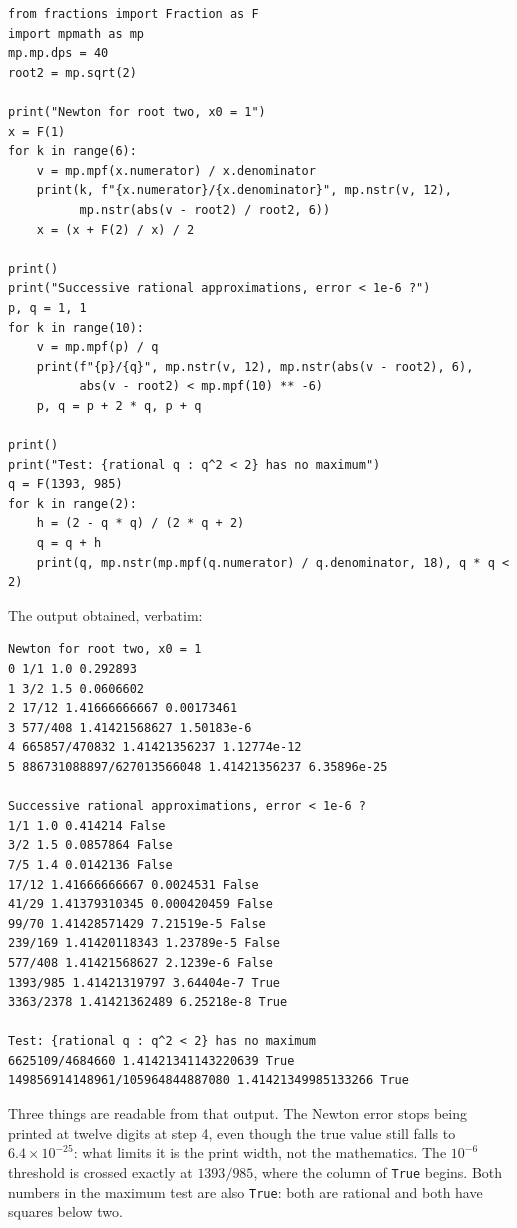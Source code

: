 \begin{lab}
\begin{verbatim}
from fractions import Fraction as F
import mpmath as mp
mp.mp.dps = 40
root2 = mp.sqrt(2)

print("Newton for root two, x0 = 1")
x = F(1)
for k in range(6):
    v = mp.mpf(x.numerator) / x.denominator
    print(k, f"{x.numerator}/{x.denominator}", mp.nstr(v, 12),
          mp.nstr(abs(v - root2) / root2, 6))
    x = (x + F(2) / x) / 2

print()
print("Successive rational approximations, error < 1e-6 ?")
p, q = 1, 1
for k in range(10):
    v = mp.mpf(p) / q
    print(f"{p}/{q}", mp.nstr(v, 12), mp.nstr(abs(v - root2), 6),
          abs(v - root2) < mp.mpf(10) ** -6)
    p, q = p + 2 * q, p + q

print()
print("Test: {rational q : q^2 < 2} has no maximum")
q = F(1393, 985)
for k in range(2):
    h = (2 - q * q) / (2 * q + 2)
    q = q + h
    print(q, mp.nstr(mp.mpf(q.numerator) / q.denominator, 18), q * q < 2)
\end{verbatim}
\end{lab}

The output obtained, verbatim:

\begin{verbatim}
Newton for root two, x0 = 1
0 1/1 1.0 0.292893
1 3/2 1.5 0.0606602
2 17/12 1.41666666667 0.00173461
3 577/408 1.41421568627 1.50183e-6
4 665857/470832 1.41421356237 1.12774e-12
5 886731088897/627013566048 1.41421356237 6.35896e-25

Successive rational approximations, error < 1e-6 ?
1/1 1.0 0.414214 False
3/2 1.5 0.0857864 False
7/5 1.4 0.0142136 False
17/12 1.41666666667 0.0024531 False
41/29 1.41379310345 0.000420459 False
99/70 1.41428571429 7.21519e-5 False
239/169 1.41420118343 1.23789e-5 False
577/408 1.41421568627 2.1239e-6 False
1393/985 1.41421319797 3.64404e-7 True
3363/2378 1.41421362489 6.25218e-8 True

Test: {rational q : q^2 < 2} has no maximum
6625109/4684660 1.41421341143220639 True
149856914148961/105964844887080 1.41421349985133266 True
\end{verbatim}

Three things are readable from that output. The Newton error stops being printed at
twelve digits at step 4, even though the true value still falls to $6.4\times10^{-25}$:
what limits it is the print width, not the mathematics. The $10^{-6}$ threshold is
crossed exactly at $1393/985$, where the column of \texttt{True} begins. Both numbers in
the maximum test are also \texttt{True}: both are rational and both have squares below
two.

